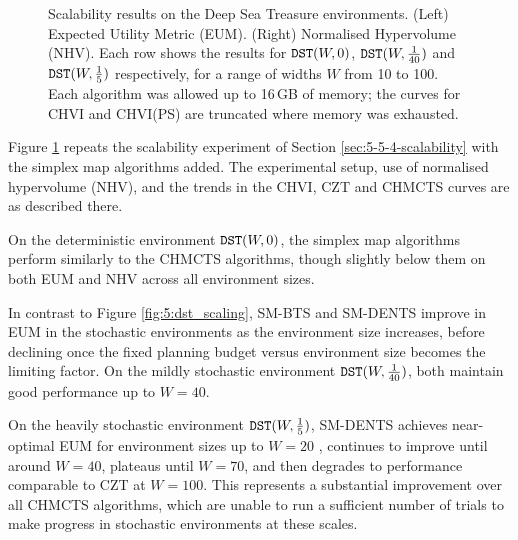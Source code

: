 \begin{figure}
        \caption[Scalability results on Deep Sea Treasure 
        environments for Simplex Maps.]{Scalability results on the Deep Sea 
        Treasure environments. (Left) Expected Utility Metric (EUM). 
        (Right) Normalised Hypervolume (NHV). Each row shows the results for 
        ${\textnormal{\texttt{DST}}}(W,0)$, ${\textnormal{\texttt{DST}}}(W,\frac{1}{40})$ and 
        ${\textnormal{\texttt{DST}}}(W,\frac{1}{5})$ respectively, for a range of widths $W$ from 10 to 100. Each algorithm was allowed up to 16\,GB of memory; the curves for CHVI and CHVI(PS) are truncated where memory was exhausted.}
        \label{fig:6:dst_scaling}
    \end{figure}

    Figure \ref{fig:6:dst_scaling} repeats the scalability experiment of Section \ref{sec:5-5-4-scalability} with the simplex map algorithms added. The experimental setup, use of normalised hypervolume (NHV), and the trends in the CHVI, CZT and CHMCTS curves 
    are as described there.

    On the deterministic environment ${\textnormal{\texttt{DST}}}(W,0)$, the simplex map algorithms perform similarly to the CHMCTS algorithms, though slightly below them on both EUM and NHV across all environment sizes.

    In contrast to Figure \ref{fig:5:dst_scaling}, SM-BTS and SM-DENTS improve in EUM in the stochastic environments as the environment size increases, before declining once the fixed planning budget versus environment size becomes the limiting factor. On the mildly stochastic environment ${\textnormal{\texttt{DST}}}(W,\frac{1}{40})$, both maintain good performance up to $W=40$.

    On the heavily stochastic environment ${\textnormal{\texttt{DST}}}(W,\frac{1}{5})$, SM-DENTS achieves near-optimal EUM for environment sizes up to $W=20$ , continues to improve until around $W=40$, plateaus until $W=70$, and then degrades to performance comparable to CZT at $W=100$. This represents a substantial improvement over all CHMCTS algorithms, which are unable to run a sufficient number of trials to make progress in stochastic environments at these scales.


